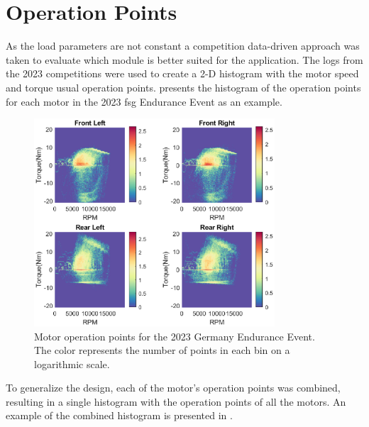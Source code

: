 \section{Operation Points}
As the load parameters are not constant a competition data-driven approach was taken to evaluate which module is better suited for the application. The logs from the 2023 competitions were used to create a 2-D histogram with the motor speed and torque usual operation points.  presents the histogram of the operation points for each motor in the 2023 \gls{fsg} Endurance Event as an example.

\begin{figure}[H]
	\centering
	\includegraphics[trim=1cm 0.3cm 1.6cm 1cm, clip, width=0.8\textwidth]{Figures/Endurance_FSG_4wd.eps}
	\caption{Motor operation points for the 2023 Germany Endurance Event. The color represents the number of points in each bin on a logarithmic scale.}
	\label{fig:motor_operation_points}
\end{figure}

To generalize the design, each of the motor's operation points was combined, resulting in a single histogram with the operation points of all the motors. An example of the combined histogram is presented in .

